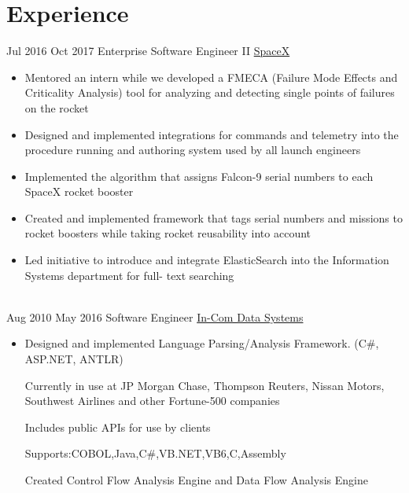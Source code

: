 \documentclass[letterpaper]{twentysecondcv} %
\begin{document}
	
\makeprofile %

\section{Experience}
\begin{twenty} %
	\twentyitem
	{Jul 2016}
	{Oct 2017}
	{Enterprise Software Engineer II}
	{\href{http://www.spacex.com/}{SpaceX}}
	{}
	{\begin{itemize}
		\item Mentored an intern while we developed a FMECA (Failure Mode Effects and Criticality Analysis) tool for
		analyzing and detecting single points of failures on the rocket
		
		\item Designed and implemented integrations for commands and telemetry into the procedure running and
		authoring system used by all launch engineers
		
		\item Implemented the algorithm that assigns Falcon-9 serial numbers to each SpaceX rocket booster
		
		\item Created and implemented framework that tags serial numbers and missions to rocket boosters while
		taking rocket reusability into account
		
		\item Led initiative to introduce and integrate ElasticSearch into the Information Systems department for full-
		text searching
	\end{itemize}}
	
	\\
	
	\twentyitem
	{Aug 2010}
	{May 2016}
	{Software Engineer}
	{\href{http://in-com.com/}{In-Com Data Systems}}
	{}
	{
		{\begin{itemize}
			\item Designed and implemented Language Parsing/Analysis Framework. (C\#, ASP.NET, ANTLR)
			
			\subitem Currently in use at JP Morgan Chase, Thompson Reuters, Nissan Motors, Southwest Airlines and
			other Fortune-500 companies
			
			\subitem Includes public APIs for use by clients
			
			\subitem Supports:COBOL,Java,C\#,VB.NET,VB6,C,Assembly
			
			\subitem Created Control Flow Analysis Engine and Data Flow Analysis Engine
			
		\end{itemize}}
	}
\end{twenty}
\end{document}

